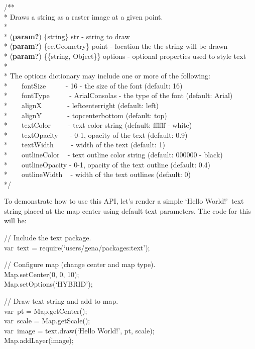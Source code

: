 \documentclass[
  letterpaper,
  DIV=11,
  numbers=noendperiod]{scrreprt}
\begin{document}
/**\\
* Draws a string as a raster image at a given point.\\
*\\
* (\textbf{param?}) \{string\} str - string to draw\\
* (\textbf{param?}) \{ee.Geometry\} point - location the the string will
be drawn\\
* (\textbf{param?}) \{\{string, Object\}\} options - optional properties
used to style text\\
*\\
* The options dictionary may include one or more of the following:\\
* ~ ~ fontSize ~ ~ ~ - 16 - the size of
the font (default: 16)\\
* ~ ~ fontType ~ ~ ~ - Arial\textbar Consolas - the type of the font
(default: Arial)\\
* ~ ~ alignX ~ ~ ~ ~ - left\textbar center\textbar right (default:
left)\\
* ~ ~ alignY ~ ~ ~ ~ - top\textbar center\textbar bottom (default:
top)\\
* ~ ~ textColor ~ ~ ~- text color string (default: ffffff - white)\\
* ~ ~ textOpacity ~ ~- 0-1, opacity of the text (default: 0.9)\\
* ~ ~ textWidth ~ ~ ~- width of the text (default: 1)\\
* ~ ~ outlineColor ~ - text outline color string (default: 000000 -
black)\\
* ~ ~ outlineOpacity - 0-1, opacity of the text outline (default: 0.4)\\
* ~ ~ outlineWidth ~ - width of the text outlines (default: 0)\\
*/

To demonstrate how to use this API, let's render a simple `Hello
World!'~text string placed at the map center using default text
parameters. The code for this will be:

// Include the text package.\\
var~text = require(`users/gena/packages:text');

// Configure map (change center and map type).\\
Map.setCenter(0, 0, 10);\\
Map.setOptions(`HYBRID');

// Draw text string and add to map.\\
var~pt = Map.getCenter();\\
var~scale = Map.getScale();\\
var~image = text.draw(`Hello World!', pt, scale);\\
Map.addLayer(image);
\end{document}
